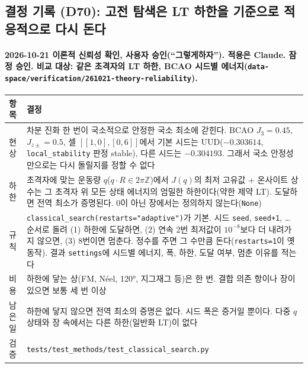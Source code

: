\subsection{결정 기록 (D70): 고전 탐색은 LT 하한을 기준으로 적응적으로 다시 돈다}\label{decisions-d70-adaptive-restarts}
\begingroup%
  \framesubtitle{2026-10-21 이론적 신뢰성 확인, 사용자 승인(``그렇게하자''). 적용은 Claude. 잠정 승인. 비교 대상: 같은 초격자의 LT 하한, BCAO 시드별 에너지(\texttt{data-space/verification/261021-theory-reliability}).}
  \small\renewcommand{\arraystretch}{1.12}
  \begin{tabularx}{\textwidth}{@{}P{3.0cm}Y@{}}
    \toprule
    항목 & 결정 \\
    \midrule
    현상 & 차분 진화 한 번이 국소적으로 안정한 국소 최소에 갇힌다. BCAO $J_3=0.45$, $J_{z\pm}=0.5$, 셀 $[[1,0],[0,6]]$에서 기본 시드는 UUD($-0.303614$, \texttt{local\_stability} 판정 stable), 다른 시드는 $-0.304193$. 그래서 국소 안정성만으로는 다시 돌릴지를 정할 수 없다 \\
    하한 & 초격자에 맞는 운동량 $q$($q\cdot R\in 2\pi\mathbb{Z}$)에서 $J(q)$의 최저 고유값 + 온사이트 상수는 그 초격자 위 모든 상태 에너지의 엄밀한 하한이다(약한 제약 LT). 도달하면 전역 최소가 증명된다. 0이 아닌 장에서는 정의하지 않는다(\texttt{None}) \\
    규칙 & \texttt{classical\_search(restarts="adaptive")}가 기본. 시드 \texttt{seed}, \texttt{seed+1}, … 순서로 돌려 (1) 하한에 도달하면, (2) 연속 2번 최저값이 $10^{-8}$보다 더 내려가지 않으면, (3) 8번이면 멈춘다. 정수를 주면 그 수만큼 돈다(\texttt{restarts=1}이 옛 동작). 결과 \texttt{settings}에 시드별 에너지, 폭, 하한, 도달 여부, 멈춘 이유를 적는다 \\
    비용 & 하한에 닿는 상(FM, Néel, 120°, 지그재그 등)은 한 번. 결합 의존 항이나 장이 있으면 보통 세 번 이상 \\
    남은 일 & 하한에 닿지 않으면 전역 최소의 증명은 없다. 시드 폭은 증거일 뿐이다. 다중 $q$ 상태와 장 속에서는 다른 하한(일반화 LT)이 없다 \\
    검증 & \texttt{tests/test\_methods/test\_classical\_search.py} \\
    \bottomrule
  \end{tabularx}
\endgroup

